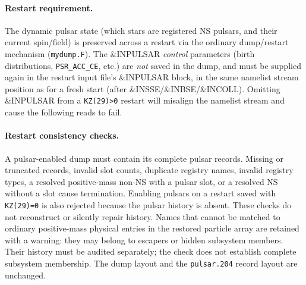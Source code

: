 \paragraph{Restart requirement.} The dynamic pulsar state (which stars are registered NS pulsars, and their current spin/field) is preserved across a restart via the ordinary dump/restart mechanism (\texttt{mydump.F}). The \&INPULSAR \emph{control} parameters (birth distributions, \texttt{PSR\_ACC\_CE}, etc.) are \emph{not} saved in the dump, and must be supplied again in the restart input file's \&INPULSAR block, in the same namelist stream position as for a fresh start (after \&INSSE/\&INBSE/\&INCOLL). Omitting \&INPULSAR from a \texttt{KZ(29)>0} restart will misalign the namelist stream and cause the following reads to fail.




\paragraph{Restart consistency checks.} A pulsar-enabled dump must contain its complete pulsar records. Missing or truncated records, invalid slot counts, duplicate registry names, invalid registry types, a resolved positive-mass non-NS with a pulsar slot, or a resolved NS without a slot cause termination. Enabling pulsars on a restart saved with \texttt{KZ(29)=0} is also rejected because the pulsar history is absent. These checks do not reconstruct or silently repair history. Names that cannot be matched to ordinary positive-mass physical entries in the restored particle array are retained with a warning: they may belong to escapers or hidden subsystem members. Their history must be audited separately; the check does not establish complete subsystem membership. The dump layout and the \texttt{pulsar.204} record layout are unchanged.
